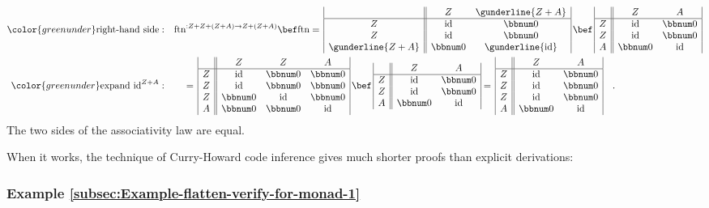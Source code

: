 \begin{align*}
{\color{greenunder}\text{right-hand side}:}\quad & \text{ftn}^{:Z+Z+\left(Z+A\right)\rightarrow Z+\left(Z+A\right)}\bef\text{ftn}=\,\begin{array}{|c||cc|}
 & Z & \gunderline{Z+A}\\
\hline Z & \text{id} & \bbnum 0\\
Z & \text{id} & \bbnum 0\\
\gunderline{Z+A} & \bbnum 0 & \gunderline{\text{id}}
\end{array}\,\bef\,\begin{array}{|c||cc|}
 & Z & A\\
\hline Z & \text{id} & \bbnum 0\\
Z & \text{id} & \bbnum 0\\
A & \bbnum 0 & \text{id}
\end{array}\\
{\color{greenunder}\text{expand }\text{id}^{Z+A}:}\quad & \quad=\,\begin{array}{|c||ccc|}
 & Z & Z & A\\
\hline Z & \text{id} & \bbnum 0 & \bbnum 0\\
Z & \text{id} & \bbnum 0 & \bbnum 0\\
Z & \bbnum 0 & \text{id} & \bbnum 0\\
A & \bbnum 0 & \bbnum 0 & \text{id}
\end{array}\,\bef\,\begin{array}{|c||cc|}
 & Z & A\\
\hline Z & \text{id} & \bbnum 0\\
Z & \text{id} & \bbnum 0\\
A & \bbnum 0 & \text{id}
\end{array}=\,\begin{array}{|c||cc|}
 & Z & A\\
\hline Z & \text{id} & \bbnum 0\\
Z & \text{id} & \bbnum 0\\
Z & \text{id} & \bbnum 0\\
A & \bbnum 0 & \text{id}
\end{array}\quad.
\end{align*}
The two sides of the associativity law are equal.

When it works, the technique of Curry-Howard code inference
gives much shorter proofs than explicit derivations:

\subsubsection{Example \label{subsec:Example-flatten-verify-for-monad-1}\ref{subsec:Example-flatten-verify-for-monad-1}}

